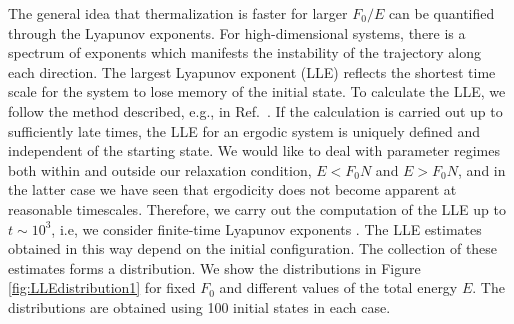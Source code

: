 \documentclass[a4paper, onecolumn]{revtex4-1}
\begin{document}
The general idea that thermalization is faster for larger $F_0/E$ can be quantified through the
Lyapunov exponents.  For high-dimensional systems, there is a spectrum of exponents which manifests
the instability of the trajectory along each direction. The largest Lyapunov exponent (LLE) reflects
the shortest time scale for the system to lose memory of the initial state.  To calculate the LLE,
we follow the method described, e.g., in Ref.~\cite{EckmannRuelle_RMP85}.  If the calculation is
carried out up to sufficiently late times, the LLE for an ergodic system is uniquely defined and
independent of the starting state.  We would like to deal with parameter regimes both within and
outside our relaxation condition, $E<F_0N$ and $E>F_0N$, and in the latter case we have seen that
ergodicity does not become apparent at reasonable timescales.  Therefore, we carry out the
computation of the LLE up to $t\sim10^3$, i.e, we consider finite-time Lyapunov exponents
\cite{FiniteTimeLyapunov}.  The LLE estimates obtained in this way depend on the initial
configuration.  The collection of these estimates forms a distribution.  We show the distributions
in Figure \ref{fig:LLEdistribution1} for fixed $F_0$ and different values of the total energy $E$.
The distributions are obtained using 100 initial states in each case.



\end{document}
